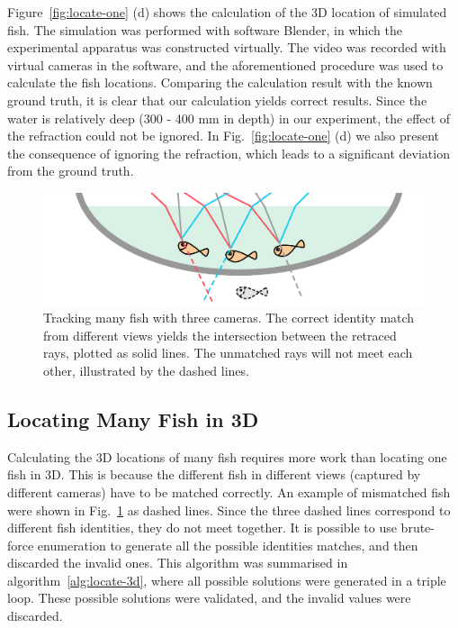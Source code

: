 \documentclass[11pt,twoside]{report}
\begin{document}
Figure~\ref{fig:locate-one} (d) shows the calculation of the 3D location of simulated fish. The simulation was performed with software Blender, in which the experimental apparatus  was constructed virtually. The video was recorded with virtual cameras in the software, and the aforementioned procedure was used to calculate the fish locations. Comparing the calculation result with the known ground truth, it is clear that our calculation yields correct results. 
Since the water is relatively deep (300 - 400 mm in depth) in our experiment, the effect of the refraction could not be ignored. In Fig.~\ref{fig:locate-one} (d) we also present the consequence of ignoring the refraction, which leads to a significant deviation from the ground truth.

\begin{figure}
  \includegraphics[width=\linewidth]{locate-many}
  \caption[The concept of tracking many fish in 3D]{Tracking many fish with three cameras. The correct identity match from different views yields the intersection between the retraced rays, plotted as solid lines. The unmatched rays will not meet each other, illustrated by the dashed lines.}
  \label{fig:locate-many}
\end{figure}


\subsection{Locating Many Fish in 3D}



Calculating the 3D locations of many fish requires more work than locating one fish in 3D. This is because the different fish in different views (captured by different cameras) have to be matched correctly.
An example of mismatched fish were shown in Fig.~\ref{fig:locate-many} as dashed lines.
Since the three dashed lines correspond to different fish identities, they do not meet together. It is possible to use brute-force enumeration to generate all the possible identities matches, and then discarded the invalid ones. This algorithm was summarised in algorithm~\ref{alg:locate-3d}, where all possible solutions were generated in a triple  loop. These possible solutions were validated, and the invalid values were discarded.
\end{document}
